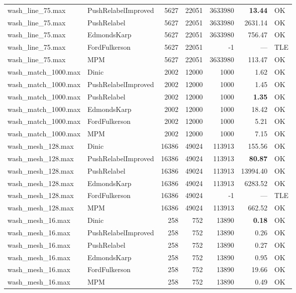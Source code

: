 \begin{longtable}{llrrrrl}
wash\_line\_75.max & PushRelabelImproved & 5627 & 22051 & 3633980 & \textbf{13.44} & OK \\
wash\_line\_75.max & PushRelabel & 5627 & 22051 & 3633980 & 2631.14 & OK \\
wash\_line\_75.max & EdmondsKarp & 5627 & 22051 & 3633980 & 756.47 & OK \\
wash\_line\_75.max & FordFulkerson & 5627 & 22051 & -1 & --- & TLE \\
wash\_line\_75.max & MPM & 5627 & 22051 & 3633980 & 113.47 & OK \\
\midrule
wash\_match\_1000.max & Dinic & 2002 & 12000 & 1000 & 1.62 & OK \\
wash\_match\_1000.max & PushRelabelImproved & 2002 & 12000 & 1000 & 1.45 & OK \\
wash\_match\_1000.max & PushRelabel & 2002 & 12000 & 1000 & \textbf{1.35} & OK \\
wash\_match\_1000.max & EdmondsKarp & 2002 & 12000 & 1000 & 18.42 & OK \\
wash\_match\_1000.max & FordFulkerson & 2002 & 12000 & 1000 & 5.21 & OK \\
wash\_match\_1000.max & MPM & 2002 & 12000 & 1000 & 7.15 & OK \\
\midrule
wash\_mesh\_128.max & Dinic & 16386 & 49024 & 113913 & 155.56 & OK \\
wash\_mesh\_128.max & PushRelabelImproved & 16386 & 49024 & 113913 & \textbf{80.87} & OK \\
wash\_mesh\_128.max & PushRelabel & 16386 & 49024 & 113913 & 13994.40 & OK \\
wash\_mesh\_128.max & EdmondsKarp & 16386 & 49024 & 113913 & 6283.52 & OK \\
wash\_mesh\_128.max & FordFulkerson & 16386 & 49024 & -1 & --- & TLE \\
wash\_mesh\_128.max & MPM & 16386 & 49024 & 113913 & 662.52 & OK \\
\midrule
wash\_mesh\_16.max & Dinic & 258 & 752 & 13890 & \textbf{0.18} & OK \\
wash\_mesh\_16.max & PushRelabelImproved & 258 & 752 & 13890 & 0.26 & OK \\
wash\_mesh\_16.max & PushRelabel & 258 & 752 & 13890 & 0.27 & OK \\
wash\_mesh\_16.max & EdmondsKarp & 258 & 752 & 13890 & 0.95 & OK \\
wash\_mesh\_16.max & FordFulkerson & 258 & 752 & 13890 & 19.66 & OK \\
wash\_mesh\_16.max & MPM & 258 & 752 & 13890 & 0.49 & OK \\

\end{longtable}
